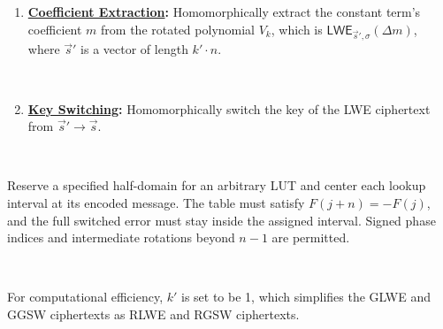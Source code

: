 \begin{tcolorbox}[title={\textbf{\tboxlabel{\ref*{subsec:tfhe-summary}} TFHE Noise Bootstrapping Procedure}}]
\begin{enumerate}
$\textsf{GLWE}_{\vec{S}_{bk}, \sigma}(\Delta V_{i+1}) = \textsf{GGSW}_{\vec{S}_{bk}, \sigma}^{\beta, l}(s_i) \cdot (\textsf{GLWE}_{\vec{S}_{bk}, \sigma}(\Delta V_i) \cdot X^{\hat{a}_i} - \textsf{GLWE}_{\vec{S}_{bk}, \sigma}(\Delta V_i)) + \textsf{GLWE}_{\vec{S}_{bk}, \sigma}(\Delta V_i)$

$ $

\item \textbf{\underline{Coefficient Extraction}:} Homomorphically extract the constant term's coefficient $m$ from the rotated polynomial $V_k$, which is $\textsf{LWE}_{\vec{s}', \sigma}(\Delta m)$, where $\vec{s}'$ is a vector of length $k' \cdot n$. 

$ $

\item \textbf{\underline{Key Switching}:} Homomorphically switch the key of the LWE ciphertext from $\vec{s}' \rightarrow \vec{s}$. 





\end{enumerate}

$ $

 Reserve a specified half-domain for an arbitrary LUT and center each lookup interval at its encoded message. The table must satisfy $F(j+n)=-F(j)$, and the full switched error must stay inside the assigned interval. Signed phase indices and intermediate rotations beyond $n-1$ are permitted.

$ $

 For computational efficiency, $k'$ is set to be 1, which simplifies the GLWE and GGSW ciphertexts as RLWE and RGSW ciphertexts.  
\end{tcolorbox}


